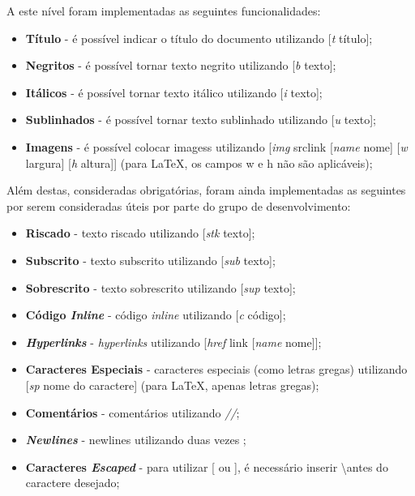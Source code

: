 \documentclass{article}
\begin{document}
 A este nível foram implementadas as seguintes funcionalidades: 
\begin{itemize}
\item \textbf{Título} - é possível indicar o título do documento utilizando [\textit{t} título];
\item \textbf{Negritos} - é possível tornar texto negrito utilizando [\textit{b} texto];
\item \textbf{Itálicos} - é possível tornar texto itálico utilizando [\textit{i} texto];
\item \textbf{Sublinhados} - é possível tornar texto sublinhado utilizando [\textit{u} texto];
\item \textbf{Imagens} - é possível colocar imagess utilizando [\textit{img} srclink [\textit{name} nome] [\textit{w} largura] [\textit{h} altura]] (para LaTeX, os campos w e h não são aplicáveis);
\end{itemize}
 Além destas, consideradas obrigatórias, foram ainda implementadas as seguintes por serem consideradas úteis por parte do grupo de desenvolvimento: 
\begin{itemize}
\item \textbf{Riscado} - texto riscado utilizando [\textit{stk} texto];
\item \textbf{Subscrito} - texto subscrito utilizando [\textit{sub} texto];
\item \textbf{Sobrescrito} - texto sobrescrito utilizando [\textit{sup} texto];
\item \textbf{Código \textit{Inline}} - código \textit{inline} utilizando [\textit{c} código];
\item \textbf{\textit{Hyperlinks}} - \textit{hyperlinks} utilizando [\textit{href} link [\textit{name} nome]];
\item \textbf{Caracteres Especiais} - caracteres especiais (como letras gregas) utilizando [\textit{sp} nome do caractere] (para LaTeX, apenas letras gregas);
\item \textbf{Comentários} - comentários utilizando \textit{//};
\item \textbf{\textit{Newlines}} - newlines utilizando duas vezes \textbackslashn;
\item \textbf{Caracteres \textit{Escaped}} - para utilizar [ ou ], é necessário inserir \textbackslash antes do caractere desejado;
\end{itemize}
\end{document}
